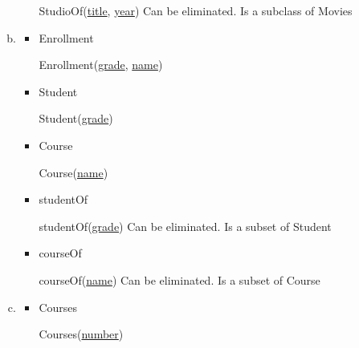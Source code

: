 \documentclass[12pt]{article}
\begin{document}
\begin{enumerate}[1.]
\begin{enumerate}[a)]
\begin{itemize}
            StudioOf(\underline{title}, \underline{year}) \color{red}Can be eliminated. Is a subclass of Movies\color{black}

            \bigskip
        \end{itemize}
        \item

        \begin{itemize}
            \item Enrollment

            \bigskip

            Enrollment(\underline{grade}, \underline{name})

            \bigskip

            \item Student

            \bigskip

            Student(\underline{grade})

            \bigskip

            \item Course

            \bigskip

            Course(\underline{name})

            \bigskip

            \item studentOf

            \bigskip

            studentOf(\underline{grade}) \color{red}Can be eliminated. Is a subset of Student\color{black}

            \bigskip

            \item courseOf

            \bigskip

            courseOf(\underline{name}) \color{red}Can be eliminated. Is a subset of Course\color{black}

            \bigskip
        \end{itemize}
        \item

        \begin{itemize}
            \item Courses

            \bigskip

            Courses(\underline{number})

            \bigskip


\end{itemize}
\end{enumerate}
\end{enumerate}
\end{document}
